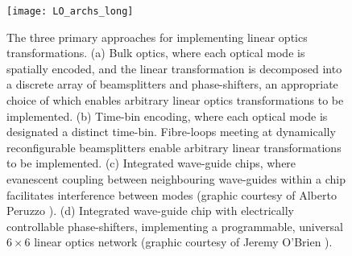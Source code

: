 \pubmode
	\begin{figure}[!htbp]
	\texttt{[image: LO\_archs\_long]}
	\captionspacefig \caption{The three primary approaches for implementing linear optics transformations. (a) Bulk optics, where each optical mode is spatially encoded, and the linear transformation is decomposed into a discrete array of beamsplitters and phase-shifters, an appropriate choice of which enables arbitrary linear optics transformations to be implemented. (b) Time-bin encoding, where each optical mode is designated a distinct time-bin. Fibre-loops meeting at dynamically reconfigurable beamsplitters enable arbitrary linear transformations to be implemented. (c) Integrated wave-guide chips, where evanescent coupling between neighbouring wave-guides within a chip facilitates interference between modes (graphic courtesy of Alberto Peruzzo \cite{bib:PeruzzoQW}). (d) Integrated wave-guide chip with electrically controllable phase-shifters, implementing a programmable, universal \mbox{$6\times 6$} linear optics network (graphic courtesy of Jeremy O'Brien \cite{bib:carolan2015universal}).} \label{fig:LO_archs}
	\end{figure}
\else
